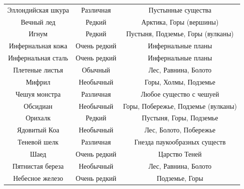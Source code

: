 \documentclass[a4paper, 9pt, twocolumn]{book}
\begin{document}
\begin{table}[H]
\begin{tabularx}{0.8\linewidth}{C c C}
				Эллондийская шкура & Различная & Пустынные существа  \\
				
				Вечный лед & Редкий & Арктика, Горы (вершины) \\
				
				Игнум & Редкий & Пустыня, Подземье, Горы (вулканы) \\
				
				Инфернальная кожа & Очень редкий & Инфернальные планы \\
				
				Инфернальная сталь & Очень редкий & Инфернальные планы \\
				
				Плетеные листья & Обычный & Лес, Равнина, Болото \\
				
				Мифрил & Необычный & Горы, Холмы, Подземье \\
				
				Чешуя монстра & Различная & Любое существо с чешуей \\
				
				Обсидиан & Необычный & Горы, Побережье, Подземье (вулканы) \\
				
				Орихалк & Редкий & Пустыня, Горы, Подземье \\
				
				Ядовитый Коа & Необычный & Лес, Болото, Побережье \\
				
				Теневой шелк & Различная & Гнезда паукообразных существ \\
				
				Шаед & Очень редкий & Царство Теней \\
				
				Пятнистая береза & Необычный & Лес, Равнина, Болото \\
				
				Небесное железо & Очень редкий & Подземье, Горы \\
				
			\end{tabularx}
		\end{table}
	
\end{document}

